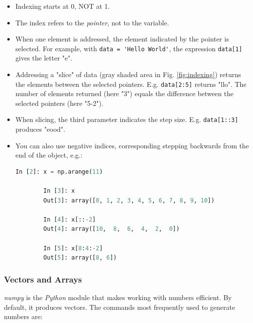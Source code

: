 \begin{itemize}
  \item Indexing starts at 0, NOT at 1.
  \item The index refers to the \emph{pointer}, not to the variable.
  \item When one element is addressed, the element indicated by the pointer is selected. For example, with \lstinline{data = 'Hello World'}, the expression \lstinline{data[1]} gives the letter "e".
  \item Addressing a "slice" of data (gray shaded area in Fig. \ref{fig:indexing}) returns the elements between the selected pointers.
        E.g. \lstinline{data[2:5]} returns "llo". The number of elements returned (here "3") equals the difference between the selected pointers (here "5-2").
  \item When slicing, the third parameter indicates the step size. E.g. \lstinline{data[1::3]} produces "eood".
  \item You can also use negative indices, corresponding stepping backwards from the end of the object, e.g.:
    \begin{lstlisting}[language=Python]
        In [2]: x = np.arange(11)

        In [3]: x
        Out[3]: array([0, 1, 2, 3, 4, 5, 6, 7, 8, 9, 10])

        In [4]: x[::-2]
        Out[4]: array([10,  8,  6,  4,  2,  0])

        In [5]: x[8:4:-2]
        Out[5]: array([8, 6])
    \end{lstlisting}

\end{itemize}

\subsubsection{Vectors and Arrays}

\emph{numpy} is the \emph{Python} module that makes working with numbers efficient. By default, it produces vectors. The commands most frequently used to generate numbers are:

